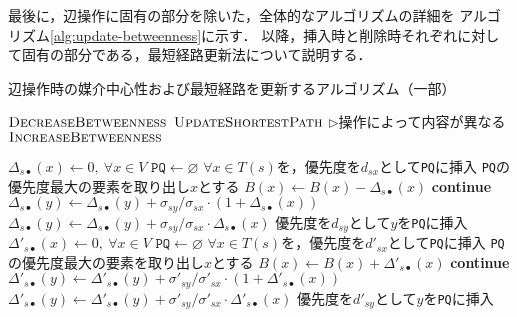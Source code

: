 最後に，辺操作に固有の部分を除いた，全体的なアルゴリズムの詳細を
アルゴリズム\ref{alg:update-betweenness}に示す．
以降，挿入時と削除時それぞれに対して固有の部分である，最短経路更新法について説明する．

\begin{algorithm}[tbp]
  \caption{辺操作時の媒介中心性および最短経路を更新するアルゴリズム（一部）}
  \label{alg:update-betweenness}
  \begin{algorithmic}[1]\small
    \State $\textproc{DecreaseBetweenness}$
    \State $\textproc{UpdateShortestPath}$
    \hspace{.3cm}$\triangleright$操作によって内容が異なる
    \State $\textproc{IncreaseBetweenness}$
    \EndProcedure
  \end{algorithmic}
  \vspace{-.5cm}
  \begin{multicols}{2}
    \begin{algorithmic}[1]\small
      \makeatletter
      \setcounter{ALG@line}{5}
      \makeatother
      \State $\Delta_{s\bullet}(x)\gets0,\:\forall x\in V$
      \State $\texttt{PQ}\gets\varnothing$
      \State $\forall x\in T(s)$を，優先度を$d_{sx}$として\texttt{PQ}に挿入
      \State \texttt{PQ}の優先度最大の要素を取り出し$x$とする
      \State $B(x)\gets B(x)-\Delta_{s\bullet}(x)$
      \State \textbf{continue}
      \EndIf
      \State $\Delta_{s\bullet}(y)\gets\Delta_{s\bullet}(y)+\sigma_{sy}/\sigma_{sx}\cdot(1+\Delta_{s\bullet}(x))$
      \Else
      \State $\Delta_{s\bullet}(y)\gets\Delta_{s\bullet}(y)+\sigma_{sy}/\sigma_{sx}\cdot\Delta_{s\bullet}(x)$
      \EndIf
      \State 優先度を$d_{sy}$として$y$を\texttt{PQ}に挿入
      \EndIf
      \EndFor
      \EndWhile
      \EndFor
      \EndProcedure
      \vfill\null
      \columnbreak
      \State $\Delta'_{s\bullet}(x)\gets0,\:\forall x\in V$
      \State $\texttt{PQ}\gets\varnothing$
      \State $\forall x\in T(s)$を，優先度を$d'_{sx}$として\texttt{PQ}に挿入
      \State \texttt{PQ}の優先度最大の要素を取り出し$x$とする
      \State $B(x)\gets B(x)+\Delta'_{s\bullet}(x)$
      \State \textbf{continue}
      \EndIf
      \State $\Delta'_{s\bullet}(y)\gets\Delta'_{s\bullet}(y)+\sigma'_{sy}/\sigma'_{sx}\cdot(1+\Delta'_{s\bullet}(x))$
      \Else
      \State $\Delta'_{s\bullet}(y)\gets\Delta'_{s\bullet}(y)+\sigma'_{sy}/\sigma'_{sx}\cdot\Delta'_{s\bullet}(x)$
      \EndIf
      \State 優先度を$d'_{sy}$として$y$を\texttt{PQ}に挿入
      \EndIf
      \EndFor
      \EndWhile
      \EndFor
      \EndProcedure
    \end{algorithmic}
  \end{multicols}
\end{algorithm}

